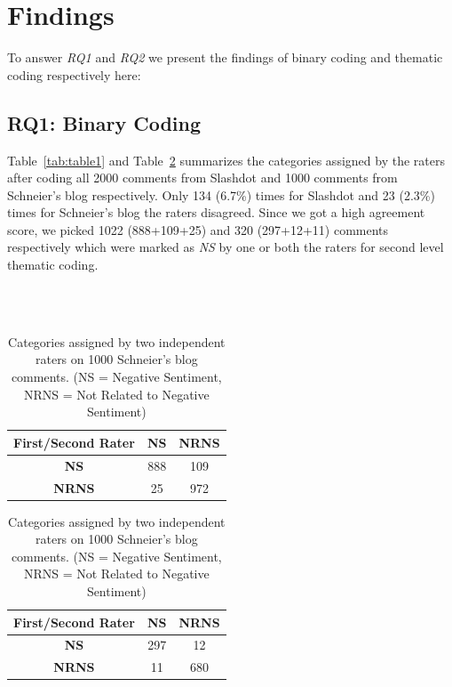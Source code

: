 \section{Findings}
\label{sec:findings}

To answer \textit{RQ1} and \textit{RQ2} we present the findings of binary coding and thematic coding respectively here:
\subsection{RQ1: Binary Coding}


Table~\ref{tab:table1} and Table~\ref{tab:table2} summarizes the categories assigned by the raters after coding all 2000 comments from Slashdot and 1000 comments from Schneier's blog respectively. Only 134 (6.7\%) times for Slashdot and 23 (2.3\%) times for Schneier's blog the raters disagreed. Since we got a high agreement score, we picked 1022 (888+109+25) and 320 (297+12+11) comments respectively which were marked as \textit{NS} by one or both the raters for second level thematic coding.

\\
\\

\newline

\newcommand{\head}[1]{\textnormal{\textbf{#1}}}


\begin{table}
\parbox{.45\linewidth}{
\centering
\begin{tabular}{ccc}
\toprule
\head{First/Second Rater} & \head{NS} & \head{NRNS}\\
\midrule
\textbf{NS}              & 888     & 109 \\                    
   \textbf{NRNS} & 25      & 972     \\
  \hline
\bottomrule 
\end{tabular}
\caption{Categories assigned by two independent raters on 2000 Slashdot comments. (NS = Negative Sentiment, NRNS = Not Related to Negative Sentiment)}
    \label{tab:table1}
}
\hfill
\parbox{.45\linewidth}{
\centering
\begin{tabular}{ccc}
\toprule
\head{First/Second Rater} & \head{NS} & \head{NRNS}\\
\midrule
\textbf{NS}              & 297     & 12 \\                    
   \textbf{NRNS} & 11      & 680     \\
  \hline
\bottomrule 
\end{tabular}
\caption{Categories assigned by two independent raters on 1000 Schneier's blog comments. (NS = Negative Sentiment, NRNS = Not Related to Negative Sentiment)}
    \label{tab:table2}
}
\end{table}


